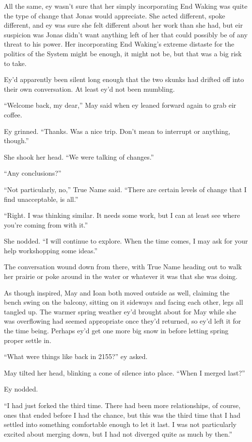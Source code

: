 All the same, ey wasn't sure that her simply incorporating End Waking was quite the type of change that Jonas would appreciate. She acted different, spoke different, and ey was sure she felt different about her work than she had, but eir suspicion was Jonas didn't want anything left of her that could possibly be of any threat to his power. Her incorporating End Waking's extreme distaste for the politics of the System might be enough, it might not be, but that was a big risk to take.

Ey'd apparently been silent long enough that the two skunks had drifted off into their own conversation. At least ey'd not been mumbling.

``Welcome back, my dear,'' May said when ey leaned forward again to grab eir coffee.

Ey grinned. ``Thanks. Was a nice trip. Don't mean to interrupt or anything, though.''

She shook her head. ``We were talking of changes.''

``Any conclusions?''

``Not particularly, no,'' True Name said. ``There are certain levels of change that I find unacceptable, is all.''

``Right. I was thinking similar. It needs some work, but I can at least see where you're coming from with it.''

She nodded. ``I will continue to explore. When the time comes, I may ask for your help workshopping some ideas.''

The conversation wound down from there, with True Name heading out to walk her prairie or poke around in the water or whatever it was that she was doing.

As though inspired, May and Ioan both moved outside as well, claiming the bench swing on the balcony, sitting on it sideways and facing each other, legs all tangled up. The warmer spring weather ey'd brought about for May while she was overflowing had seemed appropriate once they'd returned, so ey'd left it for the time being. Perhaps ey'd get one more big snow in before letting spring proper settle in.

``What were things like back in 2155?'' ey asked.

May tilted her head, blinking a cone of silence into place. ``When I merged last?''

Ey nodded.

``I had just forked the third time. There had been more relationships, of course, ones that ended before I had the chance, but this was the third time that I had settled into something comfortable enough to let it last. I was not particularly excited about merging down, but I had not diverged quite as much by then.''

